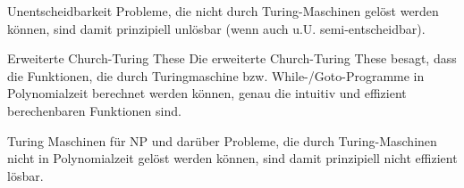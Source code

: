 \documentclass[avery5371, frame]{flashcards}
\begin{document}
\begin{flashcard}{Unentscheidbarkeit}
    Probleme, die nicht durch Turing-Maschinen gelöst werden können, sind damit prinzipiell unlösbar (wenn auch u.U. semi-entscheidbar).
\end{flashcard}

\begin{flashcard}{Erweiterte Church-Turing These}
    Die erweiterte Church-Turing These besagt, dass die Funktionen, die durch Turingmaschine bzw. While-/Goto-Programme in Polynomialzeit berechnet werden können, genau die intuitiv und effizient berechenbaren Funktionen sind.
\end{flashcard}

\begin{flashcard}{Turing Maschinen für NP und darüber}
    Probleme, die durch Turing-Maschinen nicht in Polynomialzeit gelöst werden können, sind damit prinzipiell nicht effizient lösbar.
\end{flashcard}
\end{document}
